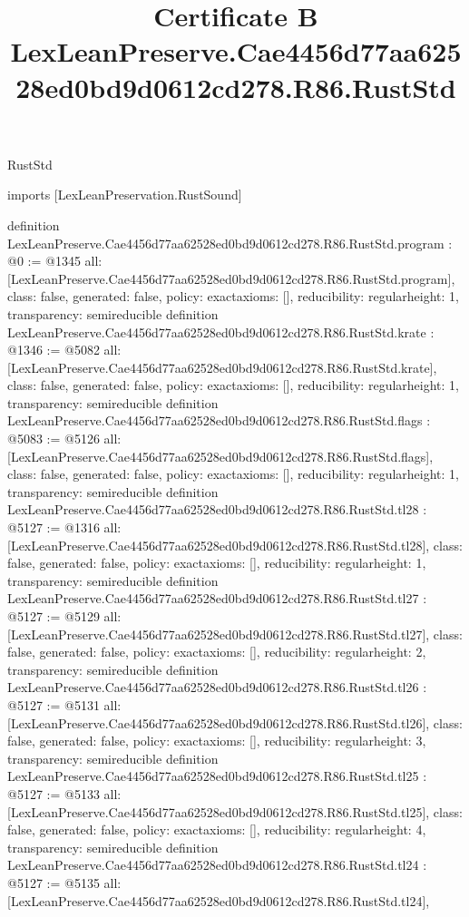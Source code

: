 \begin{lexlean}{RustStd}
\title{Certificate B LexLeanPreserve.Cae4456d77aa62528ed0bd9d0612cd278.R86.RustStd}
\begin{coremodule}
imports [LexLeanPreservation.RustSound]

definition LexLeanPreserve.Cae4456d77aa62528ed0bd9d0612cd278.R86.RustStd.program : @0 := @1345 {
  all: [LexLeanPreserve.Cae4456d77aa62528ed0bd9d0612cd278.R86.RustStd.program],
  class: false,
  generated: false,
  policy: exact{axioms: []},
  reducibility: regular{height: 1},
  transparency: semireducible
}
definition LexLeanPreserve.Cae4456d77aa62528ed0bd9d0612cd278.R86.RustStd.krate : @1346 := @5082 {
  all: [LexLeanPreserve.Cae4456d77aa62528ed0bd9d0612cd278.R86.RustStd.krate],
  class: false,
  generated: false,
  policy: exact{axioms: []},
  reducibility: regular{height: 1},
  transparency: semireducible
}
definition LexLeanPreserve.Cae4456d77aa62528ed0bd9d0612cd278.R86.RustStd.flags : @5083 := @5126 {
  all: [LexLeanPreserve.Cae4456d77aa62528ed0bd9d0612cd278.R86.RustStd.flags],
  class: false,
  generated: false,
  policy: exact{axioms: []},
  reducibility: regular{height: 1},
  transparency: semireducible
}
definition LexLeanPreserve.Cae4456d77aa62528ed0bd9d0612cd278.R86.RustStd.tl28 : @5127 := @1316 {
  all: [LexLeanPreserve.Cae4456d77aa62528ed0bd9d0612cd278.R86.RustStd.tl28],
  class: false,
  generated: false,
  policy: exact{axioms: []},
  reducibility: regular{height: 1},
  transparency: semireducible
}
definition LexLeanPreserve.Cae4456d77aa62528ed0bd9d0612cd278.R86.RustStd.tl27 : @5127 := @5129 {
  all: [LexLeanPreserve.Cae4456d77aa62528ed0bd9d0612cd278.R86.RustStd.tl27],
  class: false,
  generated: false,
  policy: exact{axioms: []},
  reducibility: regular{height: 2},
  transparency: semireducible
}
definition LexLeanPreserve.Cae4456d77aa62528ed0bd9d0612cd278.R86.RustStd.tl26 : @5127 := @5131 {
  all: [LexLeanPreserve.Cae4456d77aa62528ed0bd9d0612cd278.R86.RustStd.tl26],
  class: false,
  generated: false,
  policy: exact{axioms: []},
  reducibility: regular{height: 3},
  transparency: semireducible
}
definition LexLeanPreserve.Cae4456d77aa62528ed0bd9d0612cd278.R86.RustStd.tl25 : @5127 := @5133 {
  all: [LexLeanPreserve.Cae4456d77aa62528ed0bd9d0612cd278.R86.RustStd.tl25],
  class: false,
  generated: false,
  policy: exact{axioms: []},
  reducibility: regular{height: 4},
  transparency: semireducible
}
definition LexLeanPreserve.Cae4456d77aa62528ed0bd9d0612cd278.R86.RustStd.tl24 : @5127 := @5135 {
  all: [LexLeanPreserve.Cae4456d77aa62528ed0bd9d0612cd278.R86.RustStd.tl24],
}
\end{coremodule}
\end{lexlean}
